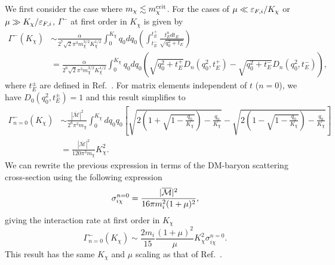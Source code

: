 We first consider the case where $m_\chi \lesssim m_\chi^{\rm crit}$. 
For the cases of $\mu \ll \varepsilon_{F,i}/K_\chi$ or $\mu \gg K_\chi/\varepsilon_{F,i}$, 
$\Gamma^{-}$ at first order in $K_\chi$ is given by
% 
\begin{align}
\Gamma^{-}(K_\chi) &\sim \frac{\alpha}{2^7\sqrt{2}\pi^3m_\chi^{3/2}K_\chi^{1/2}}\int_0^{K_\chi}q_0 dq_0 \left(\int_{t_{E}^{-}}^{t_{E}^{+}} \frac{t_E^n dt_E }{\sqrt{q_0^2+t_E}} \right)\\
&= \frac{\alpha}{2^6\sqrt{2}\pi^3m_\chi^{3/2}K_\chi^{1/2}}\int_0^{K_\chi}q_0 dq_0 \left(\sqrt{q_0^2+t_E^{+}}D_n(q_0^2,t_E^{+})-\sqrt{q_0^2+t_E^{-}}D_n(q_0^2,t_E^{-})\right), \label{ch6:eq:intratelowe}
\end{align}
% 
where $t_E^\pm$ are defined in Ref.~\cite{Bell:2020jou_sep_ImprovedTreatmentDark}. 
For matrix elements independent of $t$ ($n=0$), we have $D_0(q_0^2,t_E^{\pm})=1$  and this result simplifies to
% 
\begin{align}
\Gamma_{n=0}^{-}(K_\chi) 
&\sim  \frac{|\overline{\mathcal{M}}|^2}{2^6\pi^3m_\chi}\int_{0}^{K_\chi} dq_0 q_0 \left[\sqrt{2\left(1+\sqrt{1-\frac{q_0}{K_\chi}}\right)-\frac{q_0}{K_\chi}}-\sqrt{2\left(1-\sqrt{1-\frac{q_0}{K_\chi}}\right)-\frac{q_0}{K_\chi}}\right] \nonumber \\
&= \frac{|\overline{\mathcal{M}}|^2}{120\pi^3m_\chi}K_\chi^2.
\end{align}
% 
We can rewrite the previous expression in terms of the DM-baryon scattering cross-section using the following expression
\begin{equation}
\sigma_{i\chi}^{n=0} = \frac{|\overline{\mathcal M}|^2}{16\pi m_i^2 (1+\mu)^2}, 
\label{ch6:eq:intraten0}
\end{equation}
giving the interaction rate at first order in $K_\chi$
\begin{equation}
\Gamma_{n=0}^{-}(K_\chi)  \sim \frac{2 m_i}{15}\frac{(1+\mu)^2}{\mu}K_\chi^2 \sigma_{i\chi}^{n=0}.
\end{equation}
This result has the same $K_\chi$ and $\mu$ scaling as that of Ref.~\cite{Bertoni:2013bsa_dec_DarkMatterThermalization}.



